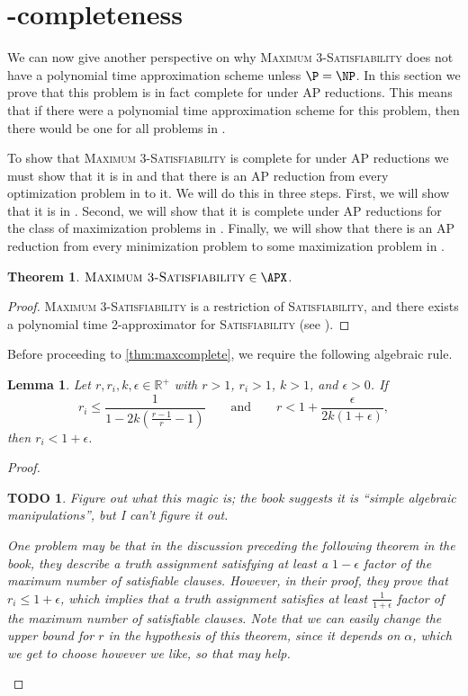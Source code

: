 \documentclass[]{article}
\theoremstyle{plain}
\newtheorem{theorem}{Theorem}
\newtheorem{lemma}{Lemma}
\newtheorem{todo}{TODO}
\theoremstyle{definition}
\begin{document}
\section{\texorpdfstring{\APX}{APX}-completeness}\label{sec:complete}

We can now give another perspective on why \textsc{Maximum 3-Satisfiability} does not have a polynomial time approximation scheme unless $\P = \NP$.
In this section we prove that this problem is in fact complete for \APX{} under AP reductions.
This means that if there were a polynomial time approximation scheme for this problem, then there would be one for all problems in \APX.

To show that \textsc{Maximum 3-Satisfiability} is complete for \APX{} under AP reductions we must show that it is in \APX{} and that there is an AP reduction from every optimization problem in \APX{} to it.
We will do this in three steps.
First, we will show that it is in \APX.
Second, we will show that it is complete under AP reductions for the class of maximization problems in \APX.
Finally, we will show that there is an AP reduction from every minimization problem to some maximization problem in \APX.

\begin{theorem}\label{thm:inapx}
  $\textsc{Maximum 3-Satisfiability} \in \APX$.
\end{theorem}
\begin{proof}
  \textsc{Maximum 3-Satisfiability} is a restriction of \textsc{Satisfiability}, and there exists a polynomial time 2-approximator for \textsc{Satisfiability} (see \cite[Program~3.1]{book}).
\end{proof}

Before proceeding to \autoref{thm:maxcomplete}, we require the following algebraic rule.

\begin{lemma}\label{lem:magic}
  Let $r, r_i, k, \epsilon \in \mathbb{R}^+$ with $r > 1$, $r_i > 1$, $k > 1$, and $\epsilon > 0$.
  If
  \begin{equation*}
    r_i \leq \frac{1}{1 - 2k(\frac{r - 1}{r} - 1)} \qquad \text{and} \qquad r < 1 + \frac{\epsilon}{2k(1 + \epsilon)},
  \end{equation*}
  then $r_i < 1 + \epsilon$.
\end{lemma}
\begin{proof}
  \begin{todo}
    Figure out what this magic is; the book suggests it is ``simple algebraic manipulations'', but I can't figure it out.

    One problem may be that in the discussion preceding the following theorem in the book, they describe a truth assignment satisfying at least a $1 - \epsilon$ factor of the maximum number of satisfiable clauses.
    However, in their proof, they prove that $r_i \leq 1 + \epsilon$, which implies that a truth assignment satisfies at least $\frac{1}{1 + \epsilon}$ factor of the maximum number of satisfiable clauses.
    Note that we can easily change the upper bound for $r$ in the hypothesis of this theorem, since it depends on $\alpha$, which we get to choose however we like, so that may help.
  \end{todo}
\end{proof}
\end{document}
